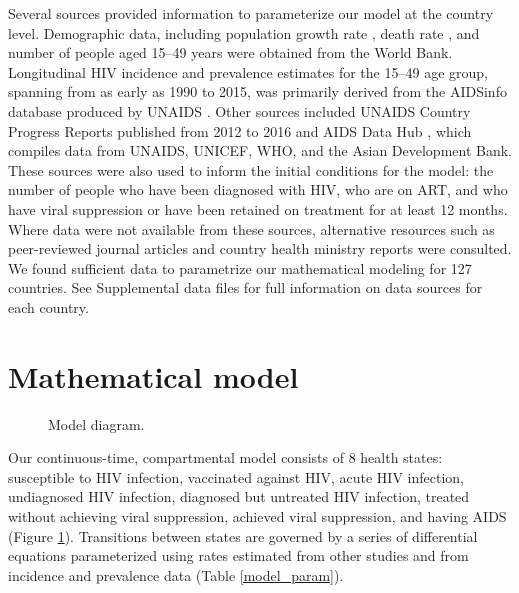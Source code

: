 \documentclass[11pt]{article}
\begin{document}
Several sources provided information to parameterize our model at the
country level. Demographic data, including population growth rate
\cite{WorldBankpg}, death rate
\cite{World_Development_Indicators2013-ee}, and number of people aged
15--49 years \cite{The_World_Bank2016-fd} were obtained from the World
Bank. Longitudinal HIV incidence and prevalence estimates for the
15--49 age group, spanning from as early as 1990 to 2015, was
primarily derived from the AIDSinfo database produced by UNAIDS
\cite{Unaids2016-an}. Other sources included UNAIDS Country Progress
Reports \cite{Unaids2016-am} published from 2012 to 2016 and AIDS Data
Hub \cite{AIDSdatahub-fg}, which compiles data from UNAIDS, UNICEF,
WHO, and the Asian Development Bank. These sources were also used to
inform the initial conditions for the model: the number of people who
have been diagnosed with HIV, who are on ART, and who have viral
suppression or have been retained on treatment for at least 12
months. Where data were not available from these sources, alternative
resources such as peer-reviewed journal articles and country health
ministry reports were consulted.  We found sufficient data to
parametrize our mathematical modeling for 127 countries.  See
Supplemental data files for full information on data sources for each
country.


\section{Mathematical model}

\begin{figure}
  \centering
  
  \caption{Model diagram.}
  \label{model_diag}
\end{figure}

Our continuous-time, compartmental model consists of 8 health states:
susceptible to HIV infection, vaccinated against HIV, acute HIV
infection, undiagnosed HIV infection, diagnosed but untreated HIV
infection, treated without achieving viral suppression, achieved viral
suppression, and having AIDS (Figure \ref{model_diag}). Transitions
between states are governed by a series of differential equations
parameterized using rates estimated from other studies and from
incidence and prevalence data (Table \ref{model_param}).
\end{document}
